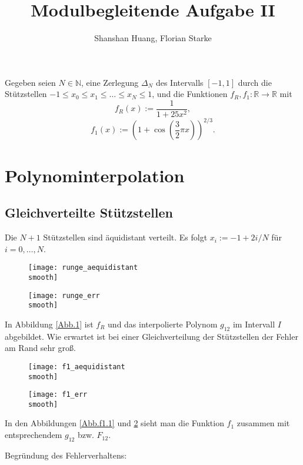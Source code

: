 \documentclass[]{scrartcl}
\title{Modulbegleitende Aufgabe II}
\author{Shanshan Huang, Florian Starke}
\newcommand{\R}{\mathbb{R}}
\newcommand{\N}{\mathbb{N}}
\begin{document}
\def\smooth{_smooth}
	\maketitle
	Gegeben seien $N\in\N$, eine Zerlegung $\Delta_N$ des Intervalls $[-1,1]$ durch die Stützstellen $-1\leq x_0\leq x_1\leq\dots\leq x_N\leq1$, und die Funktionen $f_R,f_1\colon\R\to\R$ mit
	\[f_R(x):=\frac{1}{1+25x^2},\]
	\[f_1(x):=(1+\cos(\frac{3}{2}\pi x))^{2/3}.\]
	\section{Polynominterpolation}
	\subsection{Gleichverteilte Stützstellen}
	Die $N+1$ Stützstellen sind äquidistant verteilt. Es folgt $x_i:=-1+2i/N$ für $i=0,\dots,N$.
	\begin{figure}[H]
		\centering
		\begin{minipage}{0.5\textwidth}
			\texttt{[image: runge\_aequidistant\\smooth]}
			\caption{\label{Abb.1}}
		\end{minipage}
		\begin{minipage}{0.49\textwidth}
			\texttt{[image: runge\_err\\smooth]}
			\caption{\label{Abb.2}}
		\end{minipage}
	\end{figure}
	
	In Abbildung \ref{Abb.1} ist $f_R$ und das interpolierte Polynom $g_{12}$ im Intervall $I$ abgebildet. Wie erwartet ist bei einer Gleichverteilung der Stützstellen der Fehler am Rand sehr groß.
	
	\begin{figure}[H]
		\centering
		\begin{minipage}{0.5\textwidth}
			\texttt{[image: f1\_aequidistant\\smooth]}
			\caption{\label{Abb.f1.1}}
		\end{minipage}
		\begin{minipage}{0.49\textwidth}
			\texttt{[image: f1\_err\\smooth]}
			\caption{\label{Abb.f1.2}}
		\end{minipage}
	\end{figure}
	In den Abbildungen \ref{Abb.f1.1} und \ref{Abb.f1.2} sieht man die Funktion $f_1$ zusammen mit entsprechendem $g_{12}$ bzw. $F_{12}$.
	
	
	Begründung des Fehlerverhaltens:
	
\end{document}
